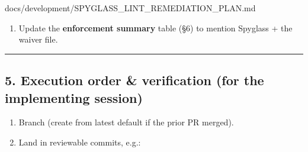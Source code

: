 \begin{relocated}{docs/development/SPYGLASS_LINT_REMEDIATION_PLAN.md}
\begin{enumerate}
  \begin{itemize}
  \tightlist
  \item
    Non-blocking (\code{<=}) exclusively in  (incl.
    reset for-loops); blocking only in  and local
    automatic temporaries.
  \item
    No empty  blocks or empty case arms --- use
    \code{;}.
  \item
    Size index/\allowbreak{}loop-temporary variables to the array they
    index (no bare  indices).
  \item
    No bare  / \texttt{\$fatal} / \texttt{\$readmemh} /
    \texttt{\$display} in synthesizable RTL --- guard with
    \texttt{`ifndef\ SYNTHESIS}.
  \item
    Match signedness/\allowbreak{}width in expressions; use explicit
    \texttt{signed'()}/\texttt{unsigned'()} casts.
  \item
    List the standing \textbf{waivers} (synchronous CPU reset, no-reset
    memories, cross-module reset naming, string-param compares) and
    point to .
  \end{itemize}
\item
  Update the \textbf{enforcement summary} table (§6) to mention Spyglass
  + the waiver file.
\end{enumerate}

\begin{center}\rule{0.5\linewidth}{0.5pt}\end{center}

\subsection{5. Execution order \& verification (for the implementing
session)}\label{um:guide:spyglass-lint-remediation:5-execution-order-verification-for-the-implementing-session}

\begin{enumerate}
\def\labelenumi{\arabic{enumi}.}
\tightlist
\item
  Branch  (create from
  latest default if the prior PR merged).
\item
  Land in reviewable commits, e.g.:


\end{enumerate}
\end{relocated}
